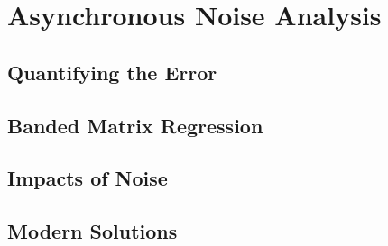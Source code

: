 \section{Asynchronous Noise Analysis}\label{sec:asyncnoise}

\subsection{Quantifying the Error}

\subsection{Banded Matrix Regression}

\subsection{Impacts of Noise}

\subsection{Modern Solutions}
